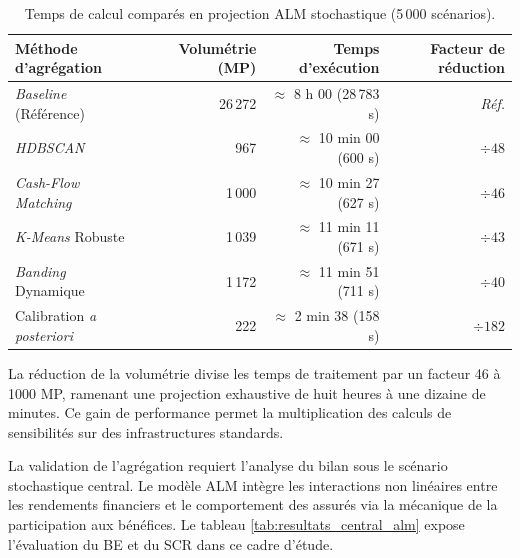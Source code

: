 \begin{table}[H]
    \centering
    \renewcommand{\arraystretch}{1.4}
    \begin{tabular}{|l|r|r|r|}
        \hline
        \textbf{Méthode d'agrégation} & \textbf{Volumétrie (MP)} & \textbf{Temps d'exécution} & \textbf{Facteur de réduction} \\
        \hline
        \textit{Baseline} (Référence) & 26\,272 & $\approx$ 8 h 00 (28\,783 s) & \textit{Réf.} \\
        \textit{HDBSCAN} & 967 & $\approx$ 10 min 00 (600 s) & $\div 48$ \\
        \textit{Cash-Flow Matching} & 1\,000 & $\approx$ 10 min 27 (627 s) & $\div 46$ \\
        \textit{K-Means} Robuste & 1\,039 & $\approx$ 11 min 11 (671 s) & $\div 43$ \\
        \textit{Banding} Dynamique & 1\,172 & $\approx$ 11 min 51 (711 s) & $\div 40$ \\
        Calibration \textit{a posteriori} & 222 & $\approx$ 2 min 38 (158 s) & $\div 182$ \\
        \hline
    \end{tabular}
    \caption{Temps de calcul comparés en projection ALM stochastique (5\,000 scénarios).}
    \label{tab:runtimes_synthese}
\end{table}

La réduction de la volumétrie divise les temps de traitement par un facteur 46 à 1000 MP, ramenant une projection exhaustive de huit heures à une dizaine de minutes. Ce gain de performance permet la multiplication des calculs de sensibilités sur des infrastructures standards.

La validation de l'agrégation requiert l'analyse du bilan sous le scénario stochastique central. Le modèle ALM intègre les interactions non linéaires entre les rendements financiers et le comportement des assurés via la mécanique de la participation aux bénéfices. Le tableau \ref{tab:resultats_central_alm} expose l'évaluation du BE et du SCR dans ce cadre d'étude.

